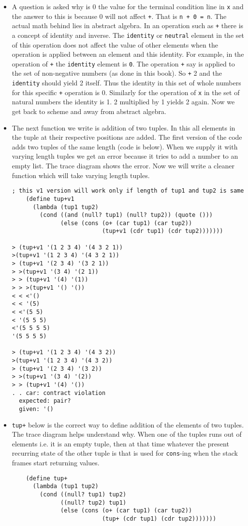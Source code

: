 \documentclass[11pt]{article}
\begin{document}
\begin{itemize}
\begin{verbatim}
\end{verbatim}
\item A question is asked why is 0 the value for the terminal condition line in \texttt{x} and the answer to this is because 0 will not affect \texttt{+}. That
is \texttt{n + 0 = n}. The actual math behind lies in abstract algebra. In an operation such as \texttt{+} there is a concept of identity and inverse. The
\texttt{identity} or \texttt{neutral} element in the set of this operation does not affect the value of other elements when the operation is applied between
an element and this identity. For example, in the operation of \texttt{+} the \texttt{identity} element is \texttt{0}. The operation \texttt{+} say is applied to the set
of non-negative numbers (as done in this book). So \texttt{+} 2 and the \texttt{identity} should yield 2 itself. Thus the identity in this set of whole
numbers for this specific \texttt{+} operation is 0. Similarly for the operation of \texttt{x} in the set of natural numbers the identity is 1. 2 multiplied
by 1 yields 2 again. Now we get back to scheme and away from abstract algebra.
\item The next function we write is addition of two tuples. In this all elements in the tuple at their respective positions are added. The first version
of the code adds two tuples of the same length (code is below). When we supply it with varying length tuples we get an error because it tries to
add a number to an empty list. The trace diagram shows the error. Now we will write a cleaner function which will take varying length tuples.
\begin{verbatim}
; this v1 version will work only if length of tup1 and tup2 is same
    (define tup+v1       
      (lambda (tup1 tup2)
        (cond ((and (null? tup1) (null? tup2)) (quote ()))
              (else (cons (o+ (car tup1) (car tup2))
                          (tup+v1 (cdr tup1) (cdr tup2)))))))

> (tup+v1 '(1 2 3 4) '(4 3 2 1))
>(tup+v1 '(1 2 3 4) '(4 3 2 1))
> (tup+v1 '(2 3 4) '(3 2 1))
> >(tup+v1 '(3 4) '(2 1))
> > (tup+v1 '(4) '(1))
> > >(tup+v1 '() '())
< < <'()
< < '(5)
< <'(5 5)
< '(5 5 5)
<'(5 5 5 5)
'(5 5 5 5)

> (tup+v1 '(1 2 3 4) '(4 3 2))
>(tup+v1 '(1 2 3 4) '(4 3 2))
> (tup+v1 '(2 3 4) '(3 2))
> >(tup+v1 '(3 4) '(2))
> > (tup+v1 '(4) '())
. . car: contract violation
  expected: pair?
  given: '()

\end{verbatim}
\item \texttt{tup+} below is the correct way to define addition of the elements of two tuples. The trace diagram helps understand why. When one of the tuples
runs out of elements i.e. it is an empty tuple, then at that time whatever the present recurring state of the other tuple is that is used for
\texttt{cons}-ing when the stack frames start returning values.
\begin{verbatim}
    (define tup+
      (lambda (tup1 tup2)
        (cond ((null? tup1) tup2)
              ((null? tup2) tup1)
              (else (cons (o+ (car tup1) (car tup2))
                          (tup+ (cdr tup1) (cdr tup2)))))))


\end{verbatim}
\end{itemize}
\end{document}
